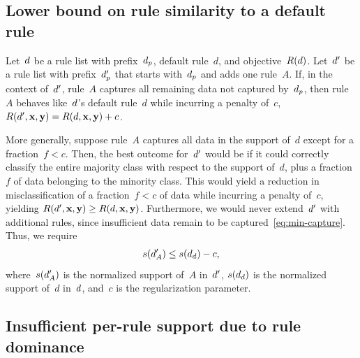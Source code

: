 

\subsection{Lower bound on rule similarity to a default rule}

Let~${d}$ be a rule list with prefix~$d_p$, default rule~$d$, and objective~$R({d})$.
%
Let~${d}'$ be a rule list with prefix~$d_p'$ that starts with~$d_p$ and adds one rule~$A$.
%
If, in the context of~${d}'$, rule~$A$ captures all remaining data not captured by~$d_p$,
then rule~$A$ behaves like~${d}$'s default rule~$d$ while incurring a penalty of~$c$,
\ie ~${R({d}', \mathbf{x}, \mathbf{y}) = R({d}, \mathbf{x}, \mathbf{y}) + c}$.

More generally, suppose rule~$A$ captures all data in the support of~$d$
except for a fraction~${f < c}$.
%
Then, the best outcome for~${d}'$ would be if it could correctly classify
the entire majority class with respect to the support of~$d$,
plus a fraction~$f$ of data belonging to the minority class.
%
This would yield a reduction in misclassification of a fraction~${f < c}$
of data while incurring a penalty of~$c$, yielding
${R({d}', \mathbf{x}, \mathbf{y}) \ge R({d}, \mathbf{x}, \mathbf{y})}$.
%
Furthermore, we would never extend~${d}'$ with additional rules,
since insufficient data remain to be captured~\eqref{eq:min-capture}.
%
Thus, we require
\begin{align}
s(\RL'_A) \le s(\RL_d) - c,
\label{eq:max-capture}
\end{align}
where~$s({d}'_A)$ is the normalized support of~$A$ in~${d}'$,
$s({d}_d)$ is the normalized support of~$d$ in~${d}$,
and~$c$ is the regularization parameter.

\subsection{Insufficient per-rule support due to rule dominance}

